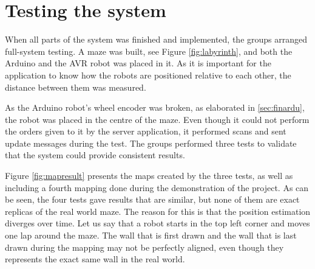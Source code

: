 \chapter{Testing the system}
When all parts of the system was finished and implemented, the groups arranged full-system testing. A maze was built, see Figure \ref{fig:labyrinth}, and both the Arduino and the AVR robot was placed in it. As it is important for the application to know how the robots are positioned relative to each other, the distance between them was measured.


As the Arduino robot's wheel encoder was broken, as elaborated in \ref{sec:finardu}, the robot was placed in the centre of the maze. Even though it could not perform the orders given to it by the server application, it performed scans and sent update messages during the test. The groups performed three tests to validate that the system could provide consistent results.

Figure \ref{fig:mapresult} presents the maps created by the three tests, as well as including a fourth mapping done during the demonstration of the project. As can be seen, the four tests gave results that are similar, but none of them are exact replicas of the real world maze. The reason for this is that the position estimation diverges over time. Let us say that a robot starts in the top left corner and moves one lap around the maze. The wall that is first drawn and the wall that is last drawn during the mapping may not be perfectly aligned, even though they represents the exact same wall in the real world.

